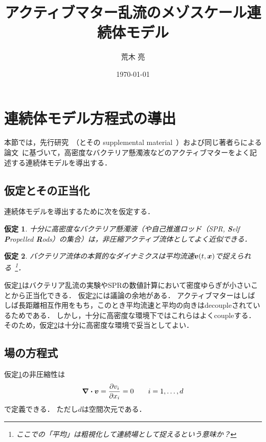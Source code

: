 \documentclass[12pt,dvipdfmx,svgnames,a4paper,uplatex]{ujarticle}
\title{アクティブマター乱流のメゾスケール連続体モデル}
\author{荒木 亮}
\date{\today}
\theoremstyle{plain}
\newtheorem{assumption}{仮定}
\begin{document}
\maketitle
\tableofcontents

\section{連続体モデル方程式の導出}
\label{sec:derive_continuous_model}

本節では，先行研究~\cite{Wensink2012b}（とその supplemental material~\cite{Wensink2012a}）および同じ著者らによる論文~\cite{Dunkel2013a}に基づいて，高密度なバクテリア懸濁液などのアクティブマターをよく記述する連続体モデルを導出する．


\subsection{仮定とその正当化}
\label{subsec:assumptions_justification}

連続体モデルを導出するために次を仮定する．

\begin{assumption}
  \label{as:incompressibility}
  十分に高密度なバクテリア懸濁液（や自己推進ロッド（SPR, \textbf{S}elf \textbf{P}ropelled \textbf{R}ods）の集合）は，非圧縮アクティブ流体としてよく近似できる．
\end{assumption}

\begin{assumption}
  \label{as:mean_velocity_field}
  バクテリア流体の本質的なダイナミクスは平均流速\(\vb*{v}(t,\vb*{x})\)で捉えられる~\footnote{ここでの「平均」は粗視化して連続場として捉えるという意味か？}．
\end{assumption}

仮定\ref{as:incompressibility}はバクテリア乱流の実験やSPRの数値計算において密度ゆらぎが小さいことから正当化できる．
仮定\ref{as:mean_velocity_field}には議論の余地がある．
アクティブマターはしばしば長距離相互作用をもち，このとき平均流速と平均の向きはdecoupleされているためである．
しかし，十分に高密度な環境下ではこれらはよくcoupleする．
そのため，仮定\ref{as:mean_velocity_field}は十分に高密度な環境で妥当としてよい．


\subsection{場の方程式}
\label{subsec:field_equation}

仮定\ref{as:incompressibility}の非圧縮性は
\begin{equation}
  \div{\vb*{v}} = \pdv{v_i}{x_i} = 0 \qquad i=1,\dots,d
  \label{eq:incompressibility}
\end{equation}
で定義できる．
ただし\(d\)は空間次元である．
\end{document}
